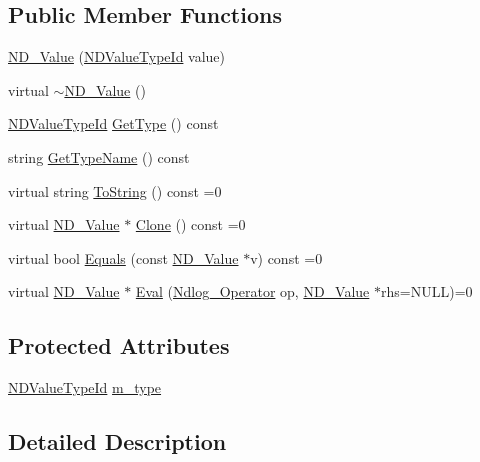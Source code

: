 \subsection*{Public Member Functions}
\begin{DoxyCompactItemize}
\item 
\hyperlink{class_n_d___value_a4381bb1dfe297b61ec7a2dca7aa0ee59}{N\-D\-\_\-\-Value} (\hyperlink{_n_dtype-ids_8h_af55089c57d3c2d854f6f5aebc517e484}{N\-D\-Value\-Type\-Id} value)
\item 
virtual \hyperlink{class_n_d___value_afe3a3a13b45142f1413d2fe2de4951d1}{$\sim$\-N\-D\-\_\-\-Value} ()
\item 
\hyperlink{_n_dtype-ids_8h_af55089c57d3c2d854f6f5aebc517e484}{N\-D\-Value\-Type\-Id} \hyperlink{class_n_d___value_a259c3f918c7fedd9d438bec96f15911a}{Get\-Type} () const 
\item 
string \hyperlink{class_n_d___value_a2c4d333803c5cd8d1f0f6cc274c85151}{Get\-Type\-Name} () const 
\item 
virtual string \hyperlink{class_n_d___value_a7660a0e6c07a198410fc05725d903219}{To\-String} () const =0
\item 
virtual \hyperlink{class_n_d___value}{N\-D\-\_\-\-Value} $\ast$ \hyperlink{class_n_d___value_a83fbc37518fd13b38059a47c422e9024}{Clone} () const =0
\item 
virtual bool \hyperlink{class_n_d___value_a7b6432defc1b1cada5a31b5c16d29ac6}{Equals} (const \hyperlink{class_n_d___value}{N\-D\-\_\-\-Value} $\ast$v) const =0
\item 
virtual \hyperlink{class_n_d___value}{N\-D\-\_\-\-Value} $\ast$ \hyperlink{class_n_d___value_aa3e290edb140d8676bfe0316c947502d}{Eval} (\hyperlink{_n_dvalue_8h_afc938fb729c95de25b4d2eb18640b303}{Ndlog\-\_\-\-Operator} op, \hyperlink{class_n_d___value}{N\-D\-\_\-\-Value} $\ast$rhs=N\-U\-L\-L)=0
\end{DoxyCompactItemize}
\subsection*{Protected Attributes}
\begin{DoxyCompactItemize}
\item 
\hyperlink{_n_dtype-ids_8h_af55089c57d3c2d854f6f5aebc517e484}{N\-D\-Value\-Type\-Id} \hyperlink{class_n_d___value_ad6a23ab31aafc1e12b829d66f910131c}{m\-\_\-type}
\end{DoxyCompactItemize}


\subsection{Detailed Description}


